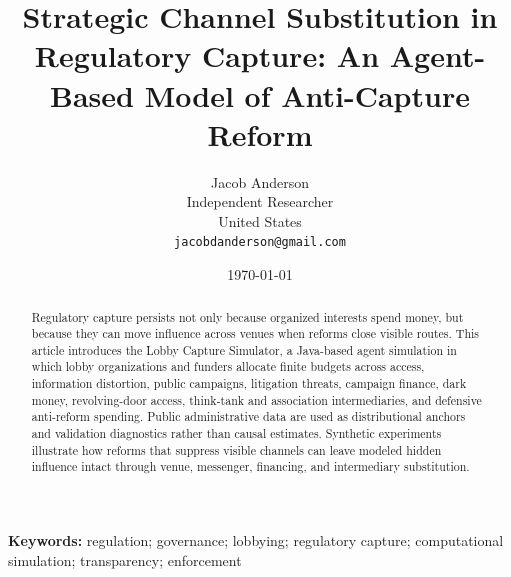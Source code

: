 \documentclass[11pt]{article}
\title{Strategic Channel Substitution in Regulatory Capture: An Agent-Based Model of Anti-Capture Reform}
\author{Jacob Anderson\\Independent Researcher\\United States\\\texttt{jacobdanderson@gmail.com}}
\date{\today}
\begin{document}
\maketitle

\begin{abstract}
Regulatory capture persists not only because organized interests spend money, but because they can move influence across venues when reforms close visible routes. This article introduces the Lobby Capture Simulator, a Java-based agent simulation in which lobby organizations and funders allocate finite budgets across access, information distortion, public campaigns, litigation threats, campaign finance, dark money, revolving-door access, think-tank and association intermediaries, and defensive anti-reform spending. Public administrative data are used as distributional anchors and validation diagnostics rather than causal estimates. Synthetic experiments illustrate how reforms that suppress visible channels can leave modeled hidden influence intact through venue, messenger, financing, and intermediary substitution.
\end{abstract}

\noindent\textbf{Keywords:} regulation; governance; lobbying; regulatory capture; computational simulation; transparency; enforcement

\bigskip







\end{document}
